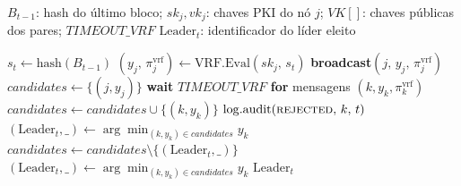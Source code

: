 \documentclass[12pt]{article}
\begin{document}
\begin{algorithm}[ht!]
\caption{VRF Leader Election — Rodada $t$}
\label{alg:vrf}
\begin{algorithmic}[1]
\Require $B_{t-1}$: hash do último bloco; $sk_j, vk_j$: chaves PKI do nó $j$;
         $\mathit{VK}[]$: chaves públicas dos pares; $\mathit{TIMEOUT\_VRF}$
\Ensure  $\mathrm{Leader}_t$: identificador do líder eleito

\State $s_t \leftarrow \mathrm{hash}(B_{t-1})$
\State $(y_j,\, \pi_j^{\mathrm{vrf}}) \leftarrow \mathrm{VRF.Eval}(sk_j,\, s_t)$
\State \textbf{broadcast}$(j,\, y_j,\, \pi_j^{\mathrm{vrf}})$
\State $\mathit{candidates} \leftarrow \{(j, y_j)\}$
\State \textbf{wait} $\mathit{TIMEOUT\_VRF}$ \textbf{for} mensagens $(k, y_k, \pi_k^{\mathrm{vrf}})$
    \State $\mathit{candidates} \leftarrow \mathit{candidates} \cup \{(k, y_k)\}$
  \Else
    \State $\mathrm{log.audit}(\textsc{rejected},\, k,\, t)$
  \EndIf
\EndFor
\State $(\mathrm{Leader}_t, \_) \leftarrow \arg\min_{(k,y_k) \in \mathit{candidates}} y_k$
  \State $\mathit{candidates} \leftarrow \mathit{candidates} \setminus \{(\mathrm{Leader}_t, \_)\}$
  \State $(\mathrm{Leader}_t, \_) \leftarrow \arg\min_{(k,y_k) \in \mathit{candidates}} y_k$
\EndIf
\State \Return $\mathrm{Leader}_t$
\end{algorithmic}
\end{algorithm}
\end{document}
